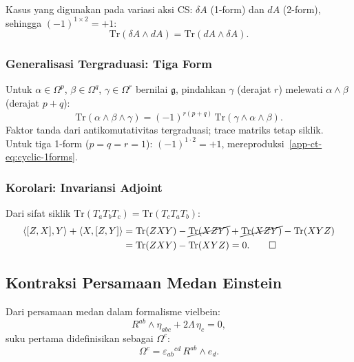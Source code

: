 Kasus yang digunakan pada variasi aksi CS: $\delta A$ (1-form) dan $dA$ (2-form), sehingga $(-1)^{1 \times 2} = +1$:
\begin{equation}
    \mathrm{Tr}(\delta A \wedge dA) = \mathrm{Tr}(dA \wedge \delta A).
\end{equation}
 
\subsubsection{Generalisasi Tergraduasi: Tiga Form}
 
Untuk $\alpha \in \Omega^p$, $\beta \in \Omega^q$, $\gamma \in \Omega^r$ bernilai $\mathfrak{g}$, pindahkan $\gamma$ (derajat $r$) melewati $\alpha \wedge \beta$ (derajat $p+q$):
\begin{equation}\label{app-ct-eq:graded-3forms}
    \mathrm{Tr}(\alpha \wedge \beta \wedge \gamma) = (-1)^{r(p+q)}\,\mathrm{Tr}(\gamma \wedge \alpha \wedge \beta).
\end{equation}
Faktor tanda dari antikomutativitas tergraduasi; trace matriks tetap siklik. Untuk tiga 1-form ($p = q = r = 1$): $(-1)^{1 \cdot 2} = +1$, mereproduksi~\eqref{app-ct-eq:cyclic-1forms}.
 
\subsubsection{Korolari: Invariansi Adjoint}
 
Dari sifat siklik $\mathrm{Tr}(T_a T_b T_c) = \mathrm{Tr}(T_c T_a T_b)$:
\begin{align}
    \langle [Z,X], Y\rangle + \langle X, [Z,Y]\rangle
    &= \mathrm{Tr}(ZXY) - \cancel{\mathrm{Tr}(XZY)} + \cancel{\mathrm{Tr}(XZY)} - \mathrm{Tr}(XYZ) \nonumber\\
    &= \mathrm{Tr}(ZXY) - \mathrm{Tr}(XYZ) = 0. \qquad\square
\end{align}
 
 \subsection{Kontraksi Persamaan Medan Einstein}
\label{app:proof-einstein-contraction}

Dari persamaan medan dalam formalisme vielbein:
\begin{equation}
    R^{ab} \wedge \eta_{abc} + 2\Lambda\, \eta_c = 0,
\end{equation}
suku pertama didefinisikan sebagai $\Omega^c$:
\begin{equation}
    \Omega^c = \varepsilon_{ab}{}^{cd}\, R^{ab} \wedge e_d.
\end{equation}

